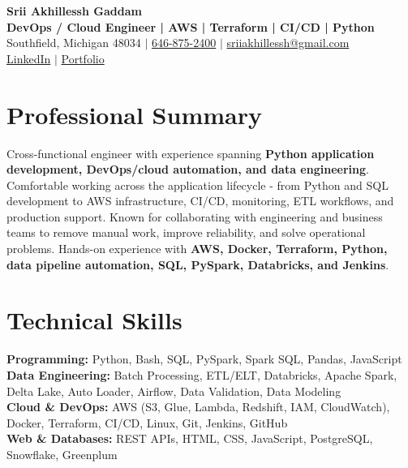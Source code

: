 \documentclass[letterpaper,10pt]{article}
\begin{document}
\fontsize{9.35pt}{10.45pt}\selectfont

\begin{center}
    {\LARGE \textbf{Srii Akhillessh Gaddam}} \\[-1pt]
    \textbf{DevOps / Cloud Engineer | AWS | Terraform | CI/CD | Python} \\[2pt]
    Southfield, Michigan 48034 $|$
    \href{tel:6468752400}{646-875-2400} $|$
    \href{mailto:sriiakhillessh@gmail.com}{sriiakhillessh@gmail.com} \\[1pt]
    \href{https://www.linkedin.com/in/srii-akhiilessh-gaddam-b48668191/}{LinkedIn} $|$
    \href{https://sriiakhillesshg.github.io/portfolio/}{Portfolio}
\end{center}
\vspace{-8pt}

\section{Professional Summary}
\small{Cross-functional engineer with experience spanning \textbf{Python application development, DevOps/cloud automation, and data engineering}. Comfortable working across the application lifecycle - from Python and SQL development to AWS infrastructure, CI/CD, monitoring, ETL workflows, and production support. Known for collaborating with engineering and business teams to remove manual work, improve reliability, and solve operational problems. Hands-on experience with \textbf{AWS, Docker, Terraform, Python, data pipeline automation, SQL, PySpark, Databricks, and Jenkins}.}

\section{Technical Skills}
\small{
\textbf{Programming:} Python, Bash, SQL, PySpark, Spark SQL, Pandas, JavaScript \\
\textbf{Data Engineering:} Batch Processing, ETL/ELT, Databricks, Apache Spark, Delta Lake, Auto Loader, Airflow, Data Validation, Data Modeling \\
\textbf{Cloud \& DevOps:} AWS (S3, Glue, Lambda, Redshift, IAM, CloudWatch), Docker, Terraform, CI/CD, Linux, Git, Jenkins, GitHub \\
\textbf{Web \& Databases:} REST APIs, HTML, CSS, JavaScript, PostgreSQL, Snowflake, Greenplum
}
\end{document}
